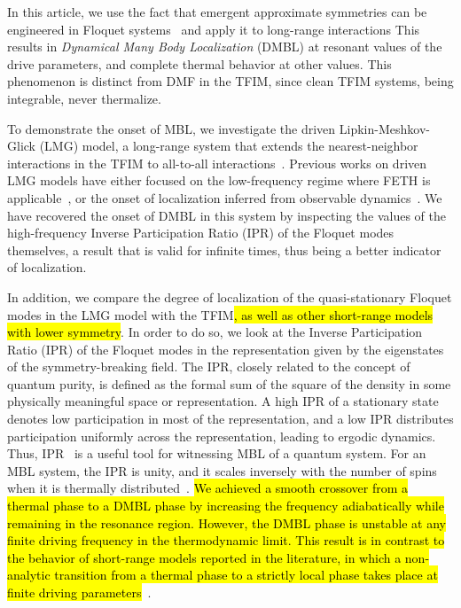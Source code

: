 \documentclass[%
reprint,
superscriptaddress,
amsmath,amssymb,
aps,
prb,
showkeys,
]{revtex4-2}
\begin{document}
In this article, {we use the fact that emergent approximate symmetries can be engineered in Floquet systems~\cite{Engelhardt2013,asmi:scars} and apply it to long-range interactions This results in \textit{Dynamical Many Body Localization} (DMBL) at resonant values of the drive parameters}, and complete thermal behavior at other values. This phenomenon is distinct from DMF in the TFIM, since clean TFIM systems, being integrable, never thermalize.

To demonstrate the onset of MBL, we investigate the driven Lipkin-Meshkov-Glick (LMG) model\cite{lmg1965_1,lmg1965_2, lmg1965_3, debergh_2001, ribeiro2008,Engelhardt2013,titum2020}, a long-range system that extends the nearest-neighbor interactions in the TFIM to  all-to-all interactions~\cite{campa_statistical_2009, eisele_multiple_1988, canning_class_1992}. Previous works on driven LMG models have either focused on the low-frequency regime where FETH is applicable~\cite{russomanno_thermalization_2015}, or the onset of localization inferred from observable dynamics~\cite{Engelhardt2013, lmg:fidelity, Russomanno2017}.  We have recovered the onset of DMBL in this system by inspecting the values of the high-frequency Inverse Participation Ratio (IPR) of the Floquet modes themselves, a result that is valid for infinite times, thus being a better indicator of localization.

In addition, we compare the degree of localization of the quasi-stationary Floquet modes in the LMG model with the TFIM\hl{, as well as other short-range models with lower symmetry}. In order to do so, we look at the Inverse Participation Ratio (IPR) of the Floquet modes in the representation given by the eigenstates of the symmetry-breaking field. The IPR, closely related to the concept of quantum purity, is defined as the formal sum of the square of the density in some physically meaningful space or representation. A high IPR of a stationary state denotes low participation in most of the representation, and a low IPR distributes participation uniformly across the representation, leading to ergodic dynamics\cite{vu_fermionic_2022}. Thus, IPR~\cite{Misguich2016} is a useful tool for witnessing MBL of a quantum system. For an MBL system, the IPR is unity, and it scales inversely with the {number of spins} when it is thermally distributed~\cite{calixto_inverse_2015}. \hl{We achieved a smooth crossover from a thermal phase to a DMBL phase by increasing the frequency adiabatically while remaining in the resonance region. However, the DMBL phase is unstable at any finite driving frequency in the thermodynamic limit. This result is in contrast to the behavior of short-range models reported in the literature, in which a non-analytic transition from a thermal phase to a strictly local phase takes place at finite driving parameters}~\cite{asmi:floquet:thermalization}.
\end{document}
